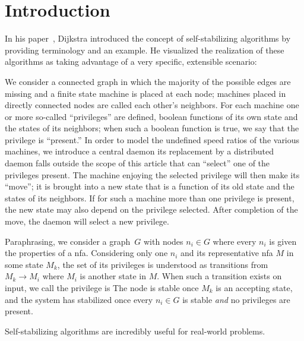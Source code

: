 \section{Introduction}
\label{sec:introduction}

In his paper~\autocite{Dijkstra:1974:SSS:361179.361202}, Dijkstra introduced
  the concept of self-stabilizing algorithms by providing terminology and an example.
He visualized the realization of these algorithms as taking advantage of
  a very specific, extensible scenario:
\begin{displayquote}
  We consider a connected graph in which
    the majority of the possible edges are missing and
    a finite state machine is placed at each node;
    machines placed in directly connected nodes are called each other's neighbors.
  For each machine one or more so-called \enquote{privileges} are defined,
    \ie boolean functions of its own state and the states of its neighbors;
    when such a boolean function is true,
    we say that the privilege is \enquote{present.}
  In order to model the undefined speed ratios of the various machines,
    we introduce a central daemon \Dash
    its replacement by a distributed daemon falls outside the scope of this article \Dash
    that can \enquote{select} one of the privileges present.
  The machine enjoying the selected privilege will then make its \enquote{move};
    \ie it is brought into a new state that is a function of
    its old state and the states of its neighbors.
  If for such a machine more than one privilege is present,
    the new state may also depend on the privilege selected.
  After completion of the move, the daemon will select a new privilege.
\end{displayquote}
Paraphrasing, we consider a graph~$G$ with nodes $n_i \in G$ where
  every $n_i$ is given the properties of a \gls{nfa}.
Considering only one $n_i$ and its representative \gls{nfa} $M$ in some state $M_k$,
  the set of its privileges is understood as transitions
  from $M_k \to M_i$ where $M_i$ is another state in $M$.
When such a transition exists on input,
  we call the privilege is 
The node is stable once $M_k$ is an accepting state,
  and the system has stabilized once every $n_i \in G$ is stable
  \emph{and} no privileges are present.

Self-stabilizing algorithms are incredibly useful for real-world problems.

